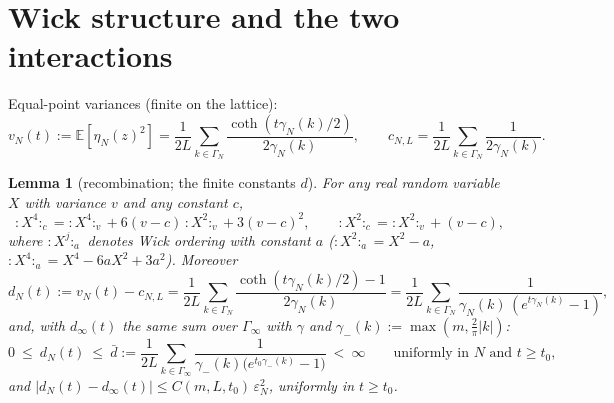 \documentclass[11pt,a4paper]{article}
\theoremstyle{plain}
\newtheorem{lemma}[theorem]{Lemma}
\theoremstyle{definition}
\newcommand{\E}{\mathbb{E}}
\newcommand{\eps}{\varepsilon}
\DeclareMathOperator{\cth}{coth}
\begin{document}
\section{Wick structure and the two interactions}\label{sec:wick}

Equal-point variances (finite on the lattice):
\[
 v_N(t):=\E[\eta_N(z)^2]
 =\frac1{2L}\sum_{k\in\Gamma_N}\frac{\cth(t\gamma_N(k)/2)}{2\gamma_N(k)},
 \qquad
 c_{N,L}=\frac1{2L}\sum_{k\in\Gamma_N}\frac1{2\gamma_N(k)} .
\]

\begin{lemma}[recombination; the finite constants $d$]\label{lem:recomb}
For any real random variable $X$ with variance $v$ and any constant $c$,
\begin{equation}
 {:}X^4{:}_c={:}X^4{:}_v+6(v-c)\,{:}X^2{:}_v+3(v-c)^2,
 \qquad
 {:}X^2{:}_c={:}X^2{:}_v+(v-c),
 \label{eq:recomb}
\end{equation}
where ${:}X^j{:}_a$ denotes Wick ordering with constant $a$
(${:}X^2{:}_a=X^2-a$, ${:}X^4{:}_a=X^4-6aX^2+3a^2$). Moreover
\begin{equation}
 d_N(t):=v_N(t)-c_{N,L}
 =\frac1{2L}\sum_{k\in\Gamma_N}
 \frac{\cth(t\gamma_N(k)/2)-1}{2\gamma_N(k)}
 =\frac1{2L}\sum_{k\in\Gamma_N}
 \frac1{\gamma_N(k)\,(e^{t\gamma_N(k)}-1)},
 \label{eq:dN}
\end{equation}
and, with $d_\infty(t)$ the same sum over $\Gamma_\infty$ with $\gamma$ and
$\gamma_-(k):=\max(m,\tfrac2\pi|k|)$:
\[
 0\ \le\ d_N(t)\ \le\ \bar d:=\frac1{2L}\sum_{k\in\Gamma_\infty}
 \frac1{\gamma_-(k)\bigl(e^{t_0\gamma_-(k)}-1\bigr)}\ <\ \infty
 \qquad\text{uniformly in $N$ and $t\ge t_0$},
\]
and $|d_N(t)-d_\infty(t)|\le C(m,L,t_0)\,\eps_N^2$, uniformly in $t\ge t_0$.
\end{lemma}
\end{document}
